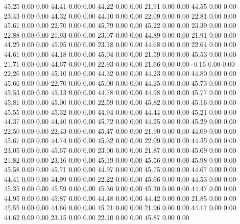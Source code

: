    45.25   0.00   0.00
   44.41   0.00   0.00
   44.22   0.00   0.00
   21.91   0.00   0.00
   44.55   0.00   0.00
   23.43   0.00   0.00
   44.32   0.00   0.00
   44.10   0.00   0.00
   22.09   0.00   0.00
   22.81   0.00   0.00
   45.61   0.00   0.00
   22.70   0.00   0.00
   45.79   0.00   0.00
   45.22   0.00   0.00
   23.39   0.00   0.00
   22.88   0.00   0.00
   21.93   0.00   0.00
   23.07   0.00   0.00
   44.89   0.00   0.00
   21.91   0.00   0.00
   44.29   0.00   0.00
   45.95   0.00   0.00
   23.18   0.00   0.00
   44.68   0.00   0.00
   22.64   0.00   0.00
   44.61   0.00   0.00
   44.18   0.00   0.00
   45.04   0.00   0.00
   21.59   0.00   0.00
   45.53   0.00   0.00
   21.71   0.00   0.00
   44.67   0.00   0.00
   22.93   0.00   0.00
   21.66   0.00   0.00
   -0.16   0.00   0.00
   22.26   0.00   0.00
   45.10   0.00   0.00
   44.32   0.00   0.00
   44.23   0.00   0.00
   44.80   0.00   0.00
   45.66   0.00   0.00
   22.70   0.00   0.00
   45.00   0.00   0.00
   44.25   0.00   0.00
   45.73   0.00   0.00
   45.53   0.00   0.00
   45.13   0.00   0.00
   44.78   0.00   0.00
   44.98   0.00   0.00
   45.77   0.00   0.00
   45.81   0.00   0.00
   45.00   0.00   0.00
   22.59   0.00   0.00
   45.82   0.00   0.00
   45.16   0.00   0.00
   45.55   0.00   0.00
   45.32   0.00   0.00
   44.94   0.00   0.00
   44.44   0.00   0.00
   45.21   0.00   0.00
   44.37   0.00   0.00
   44.40   0.00   0.00
   45.72   0.00   0.00
   44.25   0.00   0.00
   45.29   0.00   0.00
   22.50   0.00   0.00
   22.43   0.00   0.00
   45.47   0.00   0.00
   21.90   0.00   0.00
   44.09   0.00   0.00
   45.67   0.00   0.00
   44.74   0.00   0.00
   45.32   0.00   0.00
   22.09   0.00   0.00
   44.55   0.00   0.00
   23.05   0.00   0.00
   45.67   0.00   0.00
   23.00   0.00   0.00
   21.87   0.00   0.00
   45.09   0.00   0.00
   21.82   0.00   0.00
   23.16   0.00   0.00
   45.19   0.00   0.00
   45.56   0.00   0.00
   45.98   0.00   0.00
   45.58   0.00   0.00
   45.71   0.00   0.00
   44.97   0.00   0.00
   45.75   0.00   0.00
   44.67   0.00   0.00
   44.41   0.00   0.00
   44.99   0.00   0.00
   22.22   0.00   0.00
   45.66   0.00   0.00
   44.53   0.00   0.00
   45.35   0.00   0.00
   45.59   0.00   0.00
   45.36   0.00   0.00
   45.30   0.00   0.00
   44.47   0.00   0.00
   44.95   0.00   0.00
   45.87   0.00   0.00
   44.48   0.00   0.00
   44.42   0.00   0.00
   21.85   0.00   0.00
   45.55   0.00   0.00
   44.66   0.00   0.00
   45.21   0.00   0.00
   21.96   0.00   0.00
   44.17   0.00   0.00
   44.62   0.00   0.00
   23.15   0.00   0.00
   22.10   0.00   0.00
   45.87   0.00   0.00
